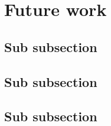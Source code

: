 \section{Future work}
\label{sec62}

\subsection{Sub subsection}
\label{sec621}


\subsection{Sub subsection}
\label{sec622}



\subsection{Sub subsection}
\label{sec623}

